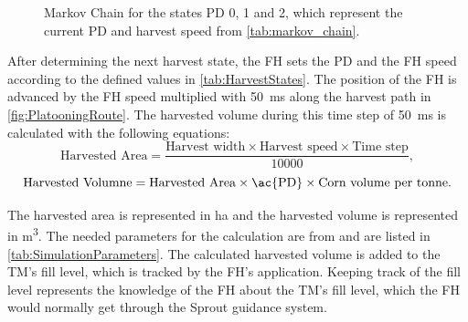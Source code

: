 \begin{figure}[H]
\centering
{}
\caption{Markov Chain for the states \acf{PD} 0, 1 and 2, which represent the current \ac{PD} and
harvest speed from \autoref{tab:markov_chain}.}
\label{fig:MarkovChain}
\end{figure}

After determining the next harvest state, the \ac{FH} sets the \ac{PD} and the \ac{FH} speed according to the defined values in
\autoref{tab:HarvestStates}.
The position of the \ac{FH} is advanced by the \ac{FH} speed multiplied with \SI{50}{\milli\second} along the
harvest path in \autoref{fig:PlatooningRoute}.
The harvested volume during this time step of \SI{50}{\milli\second} is calculated with the following
equations:
\begin{equation}
	\label{eq:AreaCalculation}
	\text{Harvested Area} =
	\frac{
		\text{Harvest width} \times \text{Harvest speed} \times \text{Time step}
	}{
		10000
	},
\end{equation}
\begin{equation}
	\label{eq:VolumneCalculation}
	\text{Harvested Volumne} =
	\text{Harvested Area} \times \text{\ac{PD}} \times \text{Corn volume per tonne}.
\end{equation}

The harvested area is represented in \si{\hectare} and
the harvested volume is represented in \si{\cubic\metre}.
The needed parameters for the calculation are from \cite{faustzahlen2018} and are listed in \autoref{tab:SimulationParameters}.
The calculated harvested volume is added to the \ac{TM}'s fill level, which is tracked by the \ac{FH}'s application.
Keeping track of the fill level represents the knowledge of the \ac{FH} about the \ac{TM}'s fill level, which the \ac{FH} would
normally get through the Sprout guidance system.

